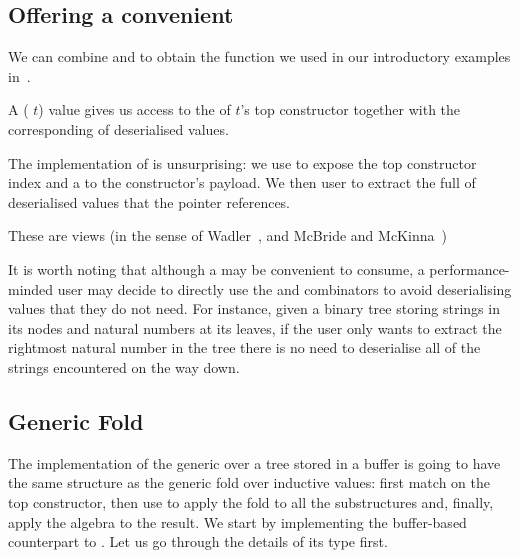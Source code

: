 \subsection{Offering a convenient }

We can combine  and  to obtain
the  function we used in our introductory examples
in~.

A ( $t$) value gives us access to the 
of $t$'s top constructor together with the corresponding
 of deserialised values.


The implementation of  is unsurprising: we use
 to expose the top constructor index and a
 to the constructor's payload.
%
We then user  to extract the full
 of deserialised values that the
pointer references.


These are views
(in the sense of Wadler~\cite{DBLP:conf/popl/Wadler87},
and McBride and McKinna~\cite{DBLP:journals/jfp/McBrideM04})

It is worth noting that although a  may be
convenient to consume, a performance-minded user may decide to
directly use the  and 
combinators to avoid deserialising values that they do not need.
%
For instance, given a binary tree storing strings in its nodes and
natural numbers at its leaves, if the user only wants to extract the
rightmost natural number in the tree there is no need to deserialise
all of the strings encountered on the way down.


\subsection{Generic Fold}\label{sec:bufferfold}

The implementation of the generic  over a tree stored
in a buffer is going to have the same structure as the generic fold over
inductive values: first match on the top constructor, then use 
to apply the fold to all the substructures and, finally, apply the algebra to
the result.
%
We start by implementing the buffer-based counterpart to .
Let us go through the details of its type first.

